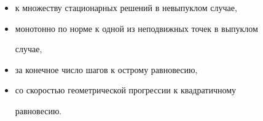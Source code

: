 \begin{itemize}


\item[---] к множеству стационарных решений в невыпуклом случае,


\item[---] монотонно по норме к одной из неподвижных точек в выпуклом


случае,


\item[---] за конечное число шагов к острому равновесию,


\item[---] со скоростью геометрической прогрессии к квадратичному


равновесию.


\end{itemize}





